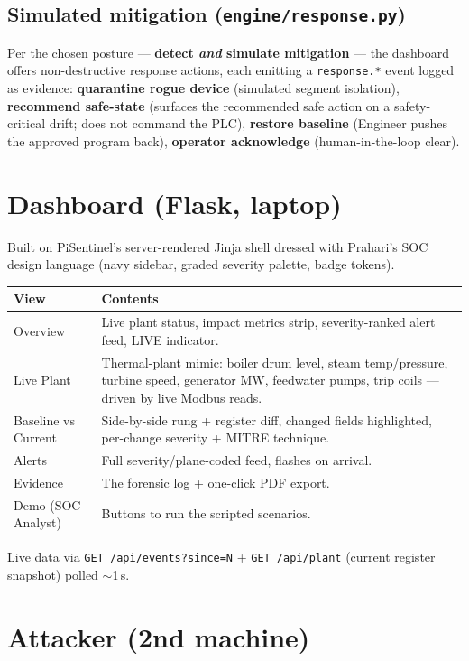\documentclass[11pt,a4paper]{article}
\newcommand{\code}[1]{\texttt{\small #1}}
\begin{document}
\subsection{Simulated mitigation (\texttt{engine/response.py})}
Per the chosen posture --- \textbf{detect \emph{and} simulate mitigation} --- the dashboard offers
non-destructive response actions, each emitting a \code{response.*} event logged as evidence:
\textbf{quarantine rogue device} (simulated segment isolation), \textbf{recommend safe-state} (surfaces
the recommended safe action on a safety-critical drift; does not command the PLC), \textbf{restore
baseline} (Engineer pushes the approved program back), \textbf{operator acknowledge}
(human-in-the-loop clear).

\section{Dashboard (Flask, laptop)}
Built on PiSentinel's server-rendered Jinja shell dressed with Prahari's SOC design language (navy
sidebar, graded severity palette, badge tokens).

\begin{tabularx}{\textwidth}{@{}p{3.2cm} L@{}}
\toprule
\textbf{View} & \textbf{Contents} \\
\midrule
Overview & Live plant status, impact metrics strip, severity-ranked alert feed, LIVE indicator. \\
Live Plant & Thermal-plant mimic: boiler drum level, steam temp/pressure, turbine speed, generator
  MW, feedwater pumps, trip coils --- driven by live Modbus reads. \\
Baseline vs Current & Side-by-side rung + register diff, changed fields highlighted, per-change
  severity + MITRE technique. \\
Alerts & Full severity/plane-coded feed, flashes on arrival. \\
Evidence & The forensic log + one-click PDF export. \\
Demo (SOC Analyst) & Buttons to run the scripted scenarios. \\
\bottomrule
\end{tabularx}

\smallskip
Live data via \code{GET /api/events?since=N} + \code{GET /api/plant} (current register snapshot)
polled $\sim$1\,s.

\section{Attacker (2nd machine)}
\end{document}
